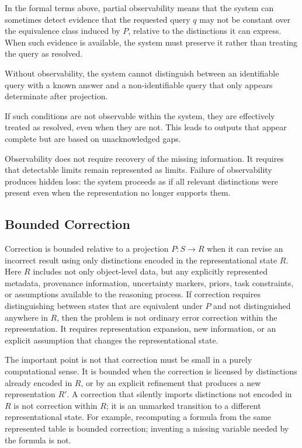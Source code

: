\documentclass[11pt]{article}
\begin{document}
In the formal terms above, partial observability means that the system can sometimes detect evidence that the requested query $q$ may not be constant over the equivalence class induced by $P$, relative to the distinctions it can express. When such evidence is available, the system must preserve it rather than treating the query as resolved.

Without observability, the system cannot distinguish between an identifiable query with a known answer and a non-identifiable query that only appears determinate after projection.

If such conditions are not observable within the system, they are effectively treated as resolved, even when they are not. This leads to outputs that appear complete but are based on unacknowledged gaps.

Observability does not require recovery of the missing information. It requires that detectable limits remain represented as limits. Failure of observability produces hidden loss: the system proceeds as if all relevant distinctions were present even when the representation no longer supports them.

\subsection{Bounded Correction}

Correction is bounded relative to a projection $P:S\rightarrow R$ when it can revise an incorrect result using only distinctions encoded in the representational state $R$. Here $R$ includes not only object-level data, but any explicitly represented metadata, provenance information, uncertainty markers, priors, task constraints, or assumptions available to the reasoning process. If correction requires distinguishing between states that are equivalent under $P$ and not distinguished anywhere in $R$, then the problem is not ordinary error correction within the representation. It requires representation expansion, new information, or an explicit assumption that changes the representational state.

The important point is not that correction must be small in a purely computational sense. It is bounded when the correction is licensed by distinctions already encoded in $R$, or by an explicit refinement that produces a new representation $R'$. A correction that silently imports distinctions not encoded in $R$ is not correction within $R$; it is an unmarked transition to a different representational state. For example, recomputing a formula from the same represented table is bounded correction; inventing a missing variable needed by the formula is not.
\end{document}
